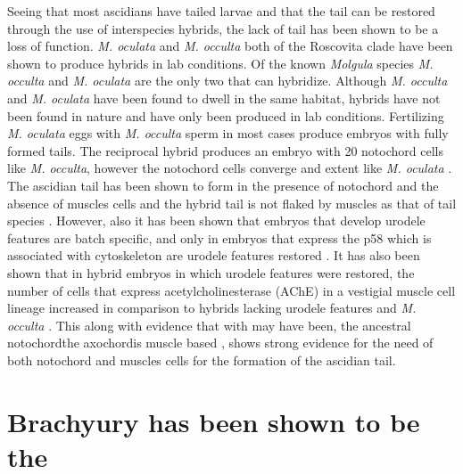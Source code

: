 Seeing that most ascidians have tailed larvae and that the tail can be restored through the use of interspecies hybrids, the lack of tail has been shown to be a loss of function. \textit{M. oculata} and \textit{M. occulta} both of the Roscovita clade have been shown to produce hybrids in lab conditions. Of the known \textit{Molgula} species \textit{M. occulta} and \textit{M. oculata} are the only two that can hybridize. Although \textit{M. occulta} and \textit{M. oculata} have been found to dwell in the same habitat, hybrids have not been found in nature and have only been produced in lab conditions. Fertilizing \textit{M. oculata} eggs with \textit{M. occulta} sperm in most cases produce embryos with fully formed tails. The reciprocal hybrid produces an embryo with 20 notochord cells like \textit{M. occulta}, however the notochord cells converge and extent like \textit{M. oculata} \cite{swalla_interspecific_1990}. The ascidian tail has been shown to form in the presence of notochord and the absence of muscles cells \cite{miyamoto_formation_1985} and the hybrid tail is not flaked by muscles as that of tail species \cite{swalla_novel_1993}. However, also it has been shown that embryos that develop urodele features are batch specific, and only in embryos that express the p58 which is associated with cytoskeleton are urodele features restored \cite{swalla_identification_1991,jeffery_factors_1992}. It has also been shown that in hybrid embryos in which urodele features were restored, the number of cells that express acetylcholinesterase (AChE) in a vestigial muscle cell lineage increased in comparison to hybrids lacking urodele features and \textit{M. occulta} \cite{jeffery_evolutionary_1991}. This along with evidence that with may have been, the ancestral notochord\textemdash the axochord\textemdash is muscle based \cite{lauri_development_2014}, shows strong evidence for the need of both notochord and muscles cells for the formation of the ascidian tail. 

\section{Brachyury has been shown to be the  }

